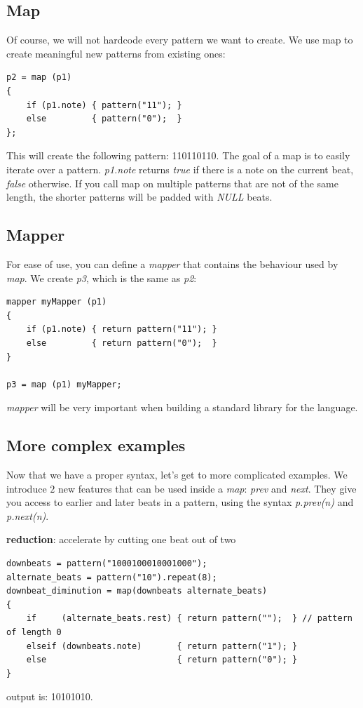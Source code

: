 \documentclass[11pt,twoside]{article}
\begin{document}
\subsection{Map}
Of course, we will not hardcode every pattern we want to create. We use
map to create meaningful new patterns from existing ones:
\begin{verbatim}
p2 = map (p1)
{
    if (p1.note) { pattern("11"); }
    else         { pattern("0");  }
};
\end{verbatim}
This will create the following pattern: 110110110. The goal of a map
is to easily iterate over a pattern. \textit{p1.note} returns
\textit{true} if there is a note on the current beat, \textit{false} otherwise.
If you call map on multiple patterns that are not of the same length,
the shorter patterns will be padded with \textit{NULL} beats.\\

\subsection{Mapper}
For ease of use, you can define a \textit{mapper} that contains the behaviour
used by \textit{map}. We create \textit{p3}, which is the same as
\textit{p2}:
\begin{verbatim}
mapper myMapper (p1)
{
    if (p1.note) { return pattern("11"); }
    else         { return pattern("0");  }
}

p3 = map (p1) myMapper;
\end{verbatim}
\textit{mapper} will be very important when building a standard library
for the language.

\subsection{More complex examples}
Now that we have a proper syntax, let's get to more complicated examples.
We introduce $2$ new features that can be used inside a \textit{map}:
\textit{prev} and \textit{next}. They give you access to earlier
and later beats in a pattern, using the syntax \textit{p.prev(n)} and
\textit{p.next(n)}. 

\textbf{reduction}: accelerate by cutting one beat out of two
\begin{verbatim}
downbeats = pattern("1000100010001000");
alternate_beats = pattern("10").repeat(8);
downbeat_diminution = map(downbeats alternate_beats)
{
    if     (alternate_beats.rest) { return pattern("");  } // pattern of length 0
    elseif (downbeats.note)       { return pattern("1"); }
    else                          { return pattern("0"); }
}
\end{verbatim}
output is: 10101010.
\end{document}
